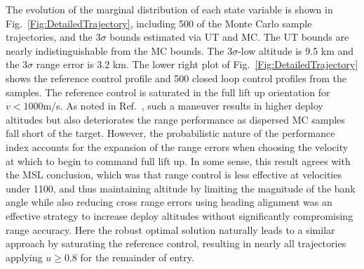 The evolution of the marginal distribution of each state variable is shown in Fig.~\ref{Fig:DetailedTrajectory}, including 500 of the Monte Carlo sample trajectories, and the 3$\sigma$ bounds estimated via UT and MC. The UT bounds are nearly indistinguishable from the MC bounds. The $3\sigma$-low altitude is 9.5 km and the $3\sigma$ range error is 3.2 km. The lower right plot of Fig.~\ref{Fig:DetailedTrajectory} shows the reference control profile and 500 closed loop control profiles from the samples.
The reference control is saturated in the full lift up orientation for $v<1000$m/s. As noted in Ref.~\cite{MSL_EDL2}, such a maneuver results in higher deploy altitudes but also deteriorates the range performance as dispersed MC samples fall short of the target. However, the probabilistic nature of the performance index accounts for the expansion of the range errors when choosing the velocity at which to begin to command full lift up. In some sense, this result agrees with the MSL conclusion, which was that range control is less effective at velocities under 1100, and thus maintaining altitude by limiting the magnitude of the bank angle while also reducing cross range errors using heading alignment was an effective strategy to increase deploy altitudes without significantly compromising range accuracy. Here the robust optimal solution naturally leads to a similar approach by saturating the reference control, resulting in nearly all trajectories applying $u \ge 0.8$ for the remainder of entry. 

